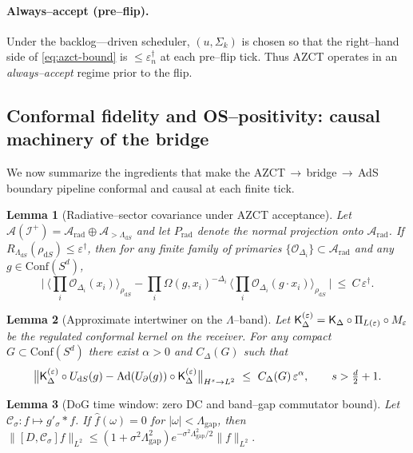 \documentclass[10pt]{article}
\theoremstyle{definition}
\theoremstyle{plain}
\newtheorem{lemma}{Lemma}[section]
\begin{document}
\paragraph{Always--accept (pre--flip).}\label{par:uom-main-200}
Under the backlog---driven scheduler, $(u,\Sigma_k)$ is chosen so that the right--hand side of \eqref{eq:azct-bound} is $\le \varepsilon_n^\dagger$ at each pre--flip tick.
Thus AZCT operates in an \emph{always--accept} regime prior to the flip.

\subsection{Conformal fidelity and OS--positivity: causal machinery of the bridge}
\label{subsec:conformal-machinery}

We now summarize the ingredients that make the AZCT\,$\rightarrow$\,bridge\,$\rightarrow$\,AdS boundary pipeline conformal and causal at each finite tick.

\begin{lemma}[Radiative--sector covariance under AZCT acceptance]
\label{lem:rad-cov-8}
Let $\mathcal A(\mathscr I^+)=\mathcal A_{\mathrm{rad}}\oplus \mathcal A_{>\Lambda_{\mathrm dS}}$ and let $P_{\mathrm{rad}}$ denote the normal projection onto $\mathcal A_{\mathrm{rad}}$.
If $R_{\Lambda_{\mathrm dS}}(\rho_{\mathrm dS})\le \varepsilon^\dagger$, then for any finite family of primaries $\{\mathcal O_{\Delta_i}\}\subset\mathcal A_{\mathrm{rad}}$ and any $g\in \mathrm{Conf}(S^d)$,
\[
\Big|\ \langle \prod_i \mathcal O_{\Delta_i}(x_i)\rangle_{\rho_{\mathrm dS}}
-\prod_i\Omega(g,x_i)^{-\Delta_i}\,\langle \prod_i \mathcal O_{\Delta_i}(g\!\cdot\!x_i)\rangle_{\rho_{\mathrm dS}}\ \Big|
\ \le\ C\,\varepsilon^\dagger .
\]
\end{lemma}

\begin{lemma}[Approximate intertwiner on the $\Lambda$--band]
\label{lem:approx-inter-8}
Let ${\sf K}_\Delta^{(\varepsilon)}={\sf K}_\Delta\circ \Pi_{L(\varepsilon)}\circ M_\varepsilon$ be the regulated conformal kernel on the receiver.
For any compact $G\subset \mathrm{Conf}(S^d)$ there exist $\alpha>0$ and $C_\Delta(G)$ such that
\[
\big\|{\sf K}_\Delta^{(\varepsilon)}\circ U_{\mathrm dS}(g)-\mathrm{Ad}(U_\partial(g))\circ {\sf K}_\Delta^{(\varepsilon)}\big\|_{H^s\to L^2}
\ \le\ C_\Delta(G)\,\varepsilon^\alpha,\qquad s>\tfrac d2+1.
\]
\end{lemma}

\begin{lemma}[DoG time window: zero DC and band--gap commutator bound]
\label{lem:dog-comm-8}
Let $\mathcal C_\sigma:f\mapsto g'_\sigma*f$.
If $\widehat f(\omega)=0$ for $|\omega|<\Lambda_{\mathrm{gap}}$, then
\(
\|[D,\mathcal C_\sigma]f\|_{L^2}\le (1+\sigma^2 \Lambda_{\mathrm{gap}}^2)e^{-\sigma^2\Lambda_{\mathrm{gap}}^2/2}\|f\|_{L^2}.
\)
\end{lemma}
\end{document}
